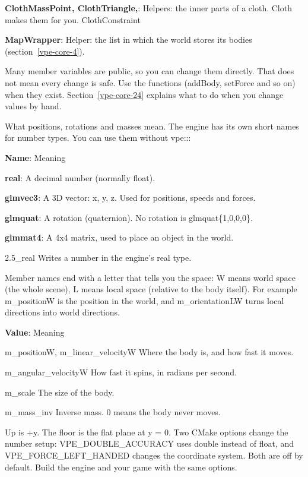 \documentclass[11pt,a4paper]{article}
\begin{document}
\textbf{ClothMassPoint, ClothTriangle,}: Helpers: the inner parts of a cloth. Cloth makes them for you. ClothConstraint

\textbf{MapWrapper}: Helper: the list in which the world stores its bodies (section~\ref{vpe-core-4}).

Many member variables are public, so you can change them directly. That does not mean every change is safe. Use the functions (addBody, setForce and so on) when they exist. Section~\ref{vpe-core-24} explains what to do when you change values by hand.

\label{vpe-core-3}
What positions, rotations and masses mean. The engine has its own short names for number types. You can use them without vpe:::

\textbf{Name}: Meaning

\textbf{real}: A decimal number (normally float).

\textbf{glmvec3}: A 3D vector: x, y, z. Used for positions, speeds and forces.

\textbf{glmquat}: A rotation (quaternion). No rotation is glmquat\{1,0,0,0\}.

\textbf{glmmat4}: A 4x4 matrix, used to place an object in the world.

2.5\_real                      Writes a number in the engine's real type.

Member names end with a letter that tells you the space: W means world space (the whole scene), L means local space (relative to the body itself). For example m\_positionW is the position in the world, and m\_orientationLW turns local directions into world directions.

\textbf{Value}: Meaning

m\_positionW, m\_linear\_velocityW                       Where the body is, and how fast it moves.

m\_angular\_velocityW                                   How fast it spins, in radians per second.

m\_scale                                               The size of the body.

m\_mass\_inv                                            Inverse mass. 0 means the body never moves.

Up is +y. The floor is the flat plane at y = 0. Two CMake options change the number setup: VPE\_DOUBLE\_ACCURACY uses double instead of float, and VPE\_FORCE\_LEFT\_HANDED changes the coordinate system. Both are off by default. Build the engine and your game with the same options.
\end{document}
